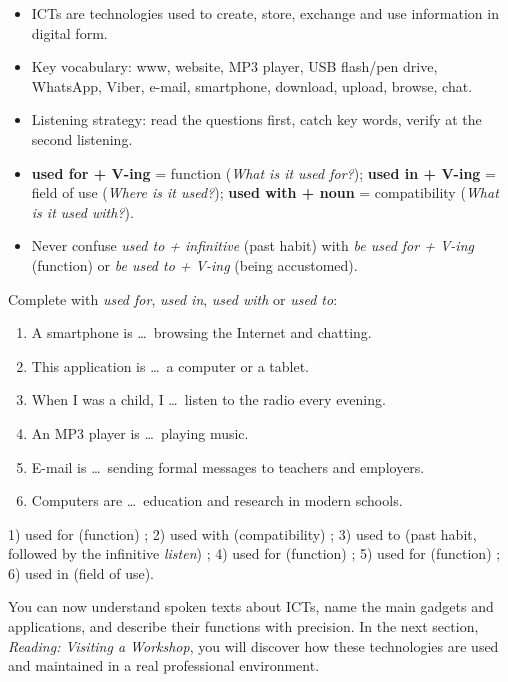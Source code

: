 \documentclass[11pt]{article}
\begin{document}
\begin{aretenir}
\begin{itemize}
\item ICTs are technologies used to create, store, exchange and use information in digital form.
\item Key vocabulary: www, website, MP3 player, USB flash/pen drive, WhatsApp, Viber, e-mail, smartphone, download, upload, browse, chat.
\item Listening strategy: read the questions first, catch key words, verify at the second listening.
\item \textbf{used for + V-ing} = function (\emph{What is it used for?}); \textbf{used in + V-ing} = field of use (\emph{Where is it used?}); \textbf{used with + noun} = compatibility (\emph{What is it used with?}).
\item Never confuse \emph{used to + infinitive} (past habit) with \emph{be used for + V-ing} (function) or \emph{be used to + V-ing} (being accustomed).
\end{itemize}
\end{aretenir}

\begin{exercice}
Complete with \emph{used for}, \emph{used in}, \emph{used with} or \emph{used to}:
\begin{enumerate}
\item A smartphone is \ldots\ browsing the Internet and chatting.
\item This application is \ldots\ a computer or a tablet.
\item When I was a child, I \ldots\ listen to the radio every evening.
\item An MP3 player is \ldots\ playing music.
\item E-mail is \ldots\ sending formal messages to teachers and employers.
\item Computers are \ldots\ education and research in modern schools.
\end{enumerate}
\end{exercice}

\begin{corrige}[Consolidation]
1) used for (function) ; 2) used with (compatibility) ; 3) used to (past habit, followed by the infinitive \emph{listen}) ; 4) used for (function) ; 5) used for (function) ; 6) used in (field of use).
\end{corrige}

You can now understand spoken texts about ICTs, name the main gadgets and applications, and describe their functions with precision. In the next section, \emph{Reading: Visiting a Workshop}, you will discover how these technologies are used and maintained in a real professional environment.
\end{document}
